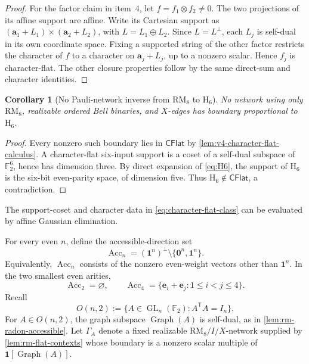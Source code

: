 \documentclass[11pt,letterpaper,onecolumn]{article}
\theoremstyle{plain}
\newtheorem{corollary}[corollary]{Corollary}
\theoremstyle{definition}
\theoremstyle{remark}
\newcommand{\Ftwo}{\mathbb F_2}
\newcommand{\one}{\mathbf 1}
\newcommand{\zero}{\mathbf 0}
\newcommand{\RMcore}{\mathrm{RM}_8}
\newcommand{\Hcore}{\mathrm{H}_6}
\begin{document}
\begin{proof}
For the factor claim in item~4, let \(f=f_1\otimes f_2\ne0\).
The two projections of its affine support are affine. Write its Cartesian
support as \(({\mathbf{a}}_1+L_1)\times({\mathbf{a}}_2+L_2)\), with
\(L=L_1\oplus L_2\).  Since \(L=L^\perp\), each \(L_j\) is
self-dual in its own coordinate space.  Fixing a supported string of the
other factor restricts the character of \(f\) to a character on
\({\mathbf{a}}_j+L_j\), up to a nonzero scalar.  Hence \(f_j\) is character-flat.
The other closure properties follow by the same direct-sum and character
identities.
\end{proof}

\begin{corollary}[No Pauli-network inverse from \(\RMcore\) to \(\Hcore\)]
\label{cor:no-rm-to-H6}
No network using only \(\RMcore\), realizable ordered Bell binaries, and \(X\)-edges has boundary proportional to \(\Hcore\).
\end{corollary}

\begin{proof}
Every nonzero such boundary lies in \(\mathsf{CFlat}\) by
\cref{lem:v4-character-flat-calculus}.  A character-flat six-input support is
a coset of a self-dual subspace of \(\Ftwo^6\), hence has dimension three.
By direct expansion of \cref{eq:H6}, the support of \(\Hcore\) is the
six-bit even-parity space, of dimension five.  Thus
\(\Hcore\notin\mathsf{CFlat}\), a contradiction.
\end{proof}

The support-coset and character data in
\cref{eq:character-flat-class} can be evaluated by affine Gaussian
elimination.

For every even \(n\), define the accessible-direction set
\[
\operatorname{Acc}_n
 =(\one^n)^\perp\setminus\{\zero^n,\one^n\}.
\]
Equivalently, \(\operatorname{Acc}_n\) consists of the nonzero even-weight
vectors other than \(\one^n\).  In the two smallest even arities,
\[
 \operatorname{Acc}_2=\varnothing,
 \qquad
 \operatorname{Acc}_4
   =\{{\mathbf{e}}_i+{\mathbf{e}}_j:1\le i<j\le4\}.
\]
Recall
\[
 O(n,2):=\{A\in\operatorname{GL}_n(\Ftwo):A^{\mathsf T}A=I_n\}.
\]
For \(A\in O(n,2)\), the graph subspace \(\operatorname{Graph}(A)\)
is self-dual, as in \cref{lem:rm-radon-accessible}.
Let \(\Gamma_A\) denote a fixed realizable \(\RMcore/I/X\)-network supplied by
\cref{lem:rm-flat-contexts} whose boundary is a nonzero scalar multiple of
\(\one[\operatorname{Graph}(A)]\).
\end{document}
